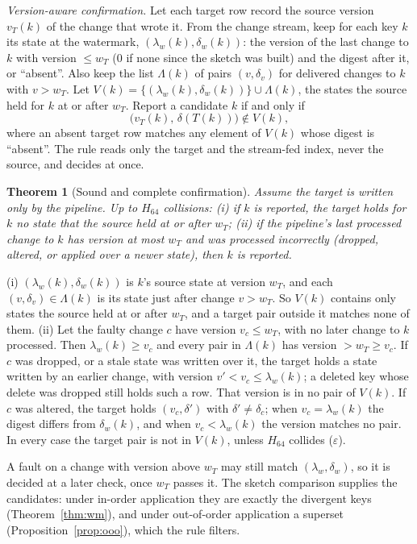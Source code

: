 \documentclass[conference]{IEEEtran}
\newtheorem{theorem}{Theorem}
\begin{document}
\emph{Version-aware confirmation.} Let each target row record the source version $v_T(k)$ of the change that wrote it. From the change stream, keep for each key $k$ its state at the watermark, $(\lambda_w(k),\delta_w(k))$: the version of the last change to $k$ with version $\le w_T$ (0 if none since the sketch was built) and the digest after it, or ``absent''. Also keep the list $\Lambda(k)$ of pairs $(v,\delta_v)$ for delivered changes to $k$ with $v>w_T$. Let $V(k)=\{(\lambda_w(k),\delta_w(k))\}\cup\Lambda(k)$, the states the source held for $k$ at or after $w_T$. Report a candidate $k$ if and only if
\[
\big(v_T(k),\,\delta(T(k))\big)\notin V(k),
\]
where an absent target row matches any element of $V(k)$ whose digest is ``absent''. The rule reads only the target and the stream-fed index, never the source, and decides at once.

\begin{theorem}[Sound and complete confirmation]\label{thm:confirm}
Assume the target is written only by the pipeline. Up to $H_{64}$ collisions: (i) if $k$ is reported, the target holds for $k$ no state that the source held at or after $w_T$; (ii) if the pipeline's last processed change to $k$ has version at most $w_T$ and was processed incorrectly (dropped, altered, or applied over a newer state), then $k$ is reported.
\end{theorem}
\begin{IEEEproof}
(i) $(\lambda_w(k),\delta_w(k))$ is $k$'s source state at version $w_T$, and each $(v,\delta_v)\in\Lambda(k)$ is its state just after change $v>w_T$. So $V(k)$ contains only states the source held at or after $w_T$, and a target pair outside it matches none of them.
(ii) Let the faulty change $c$ have version $v_c\le w_T$, with no later change to $k$ processed. Then $\lambda_w(k)\ge v_c$ and every pair in $\Lambda(k)$ has version $>w_T\ge v_c$. If $c$ was dropped, or a stale state was written over it, the target holds a state written by an earlier change, with version $v'<v_c\le\lambda_w(k)$; a deleted key whose delete was dropped still holds such a row. That version is in no pair of $V(k)$. If $c$ was altered, the target holds $(v_c,\delta')$ with $\delta'\neq\delta_c$; when $v_c=\lambda_w(k)$ the digest differs from $\delta_w(k)$, and when $v_c<\lambda_w(k)$ the version matches no pair. In every case the target pair is not in $V(k)$, unless $H_{64}$ collides ($\varepsilon$).
\end{IEEEproof}

A fault on a change with version above $w_T$ may still match $(\lambda_w,\delta_w)$, so it is decided at a later check, once $w_T$ passes it. The sketch comparison supplies the candidates: under in-order application they are exactly the divergent keys (Theorem~\ref{thm:wm}), and under out-of-order application a superset (Proposition~\ref{prop:ooo}), which the rule filters.
\end{document}
